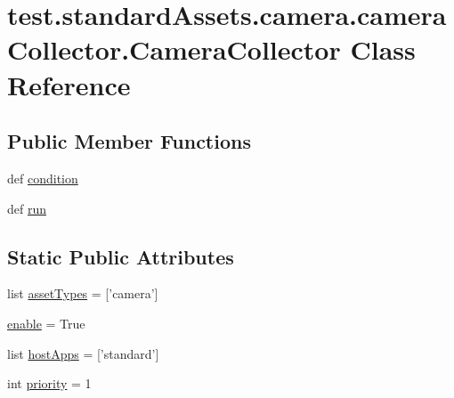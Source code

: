 \hypertarget{classtest_1_1standardAssets_1_1camera_1_1cameraCollector_1_1CameraCollector}{\section{test.\-standard\-Assets.\-camera.\-camera\-Collector.\-Camera\-Collector \-Class \-Reference}
\label{dc/dd5/classtest_1_1standardAssets_1_1camera_1_1cameraCollector_1_1CameraCollector}
}
\subsection*{\-Public \-Member \-Functions}
\begin{DoxyCompactItemize}
\item 
def \hyperlink{classtest_1_1standardAssets_1_1camera_1_1cameraCollector_1_1CameraCollector_aae5b44afca14771d80f293049fe8bcc8}{condition}
\item 
def \hyperlink{classtest_1_1standardAssets_1_1camera_1_1cameraCollector_1_1CameraCollector_afdc9480caaf35f00122d9201fed84b2d}{run}
\end{DoxyCompactItemize}
\subsection*{\-Static \-Public \-Attributes}
\begin{DoxyCompactItemize}
\item 
list \hyperlink{classtest_1_1standardAssets_1_1camera_1_1cameraCollector_1_1CameraCollector_aad9a9791d50f0cf07b5ec6debfb17648}{asset\-Types} = \mbox{[}'camera'\mbox{]}
\item 
\hyperlink{classtest_1_1standardAssets_1_1camera_1_1cameraCollector_1_1CameraCollector_a2ff546fd53d5ba35a666948d017a427c}{enable} = \-True
\item 
list \hyperlink{classtest_1_1standardAssets_1_1camera_1_1cameraCollector_1_1CameraCollector_a5d60c9723d793aad5dff7903fc91dd2b}{host\-Apps} = \mbox{[}'standard'\mbox{]}
\item 
int \hyperlink{classtest_1_1standardAssets_1_1camera_1_1cameraCollector_1_1CameraCollector_a40ea70c11f7648b3c43b97cb6e2f03c5}{priority} = 1
\end{DoxyCompactItemize}



